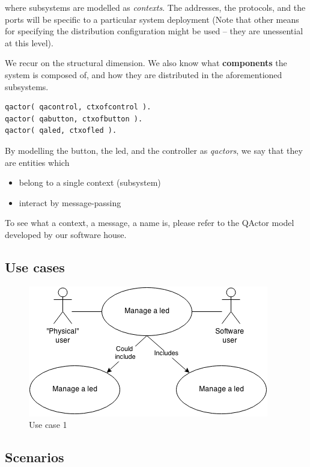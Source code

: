 \documentclass{article}
\newcommand{\labelssec}[1]{\label{ssec:#1}}
\newcommand{\mycolor}{myrgb}
\newcommand{\colorize}[1]{{\color{\mycolor}#1}}
\begin{document}
\colorize{where subsystems are modelled as \emph{contexts}. The addresses, the
protocols, and the ports will be specific to a particular system deployment
(Note that other means for specifying the distribution configuration might be
used -- they are unessential at this level).

We recur on the structural dimension.
We also know what \textbf{components} the system is composed of, and how they are distributed in
the aforementioned subsystems.}

\begin{lstlisting}
qactor( qacontrol, ctxofcontrol ).
qactor( qabutton, ctxofbutton ).
qactor( qaled, ctxofled ).
\end{lstlisting}

\colorize{
By modelling the button, the led, and the controller as \emph{qactors}, we say
that they are entities which
\begin{itemize}
  \item belong to a single context (subsystem)
  \item interact by message-passing
\end{itemize}

To see what a context, a message, a name is, please refer to the QActor model
developed by our software house.
}

\subsection{Use cases}
\labelssec{UseCases}

\begin{figure}[H]
    \centering
     \includegraphics[scale = 0.6]{img/BLS-UseCase.png}
    \caption{Use case 1}
    \label{fig:usecase1}
\end{figure}


\subsection{Scenarios}
\labelssec{Scenarios}
\end{document}

